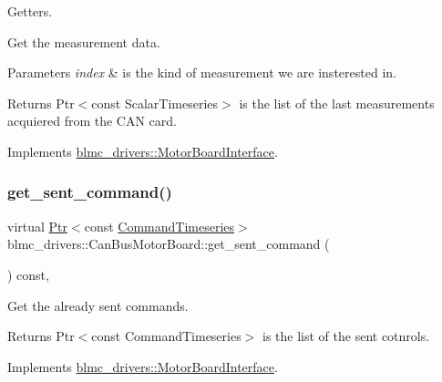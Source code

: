 Getters. 

Get the measurement data.


\begin{DoxyParams}{Parameters}
{\em index} & is the kind of measurement we are insterested in. \\
\hline
\end{DoxyParams}
\begin{DoxyReturn}{Returns}
Ptr$<$const Scalar\+Timeseries$>$ is the list of the last measurements acquiered from the C\+AN card. 
\end{DoxyReturn}


Implements \hyperlink{classblmc__drivers_1_1MotorBoardInterface_a34828a0375a3bd1fede4deb4fc74c04d}{blmc\+\_\+drivers\+::\+Motor\+Board\+Interface}.

\mbox{\label{classblmc__drivers_1_1CanBusMotorBoard_a5025602eac7b8c4ca1b2f5602e1a6640}} 
\subsubsection{\texorpdfstring{get\+\_\+sent\+\_\+command()}{get\_sent\_command()}}
{\footnotesize\ttfamily virtual \hyperlink{classblmc__drivers_1_1MotorBoardInterface_a6a733b7ed7a3a96f6b0712b6bb5307f8}{Ptr}$<$const \hyperlink{classblmc__drivers_1_1MotorBoardInterface_ae2afe94a023d9f08a4c689e9b7660f15}{Command\+Timeseries}$>$ blmc\+\_\+drivers\+::\+Can\+Bus\+Motor\+Board\+::get\+\_\+sent\+\_\+command (\begin{DoxyParamCaption}{ }\end{DoxyParamCaption}) const\hspace{0.3cm}{\ttfamily [inline]}, {\ttfamily [virtual]}}



Get the already sent commands. 

\begin{DoxyReturn}{Returns}
Ptr$<$const Command\+Timeseries$>$ is the list of the sent cotnrols. 
\end{DoxyReturn}


Implements \hyperlink{classblmc__drivers_1_1MotorBoardInterface_afd3de58f7a900347154b8d323f1c1d94}{blmc\+\_\+drivers\+::\+Motor\+Board\+Interface}.

